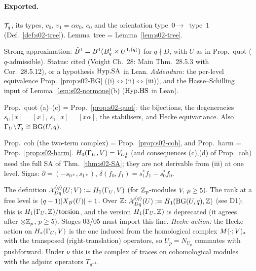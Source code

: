 \paragraph{Exported.}
\begin{interface}\label{if:s02-tree}
$\mathcal{T}_q$, its types, $v_0$, $v_1=\alpha v_0$, $e_0$ and the orientation type~$0\to$~type~$1$
(Def.~\ref{def:s02-tree}). Lemma~tree = Lemma~\ref{lem:s02-tree}.
\end{interface}
\begin{interface}[\texttt{if:s02-SA}]\label{if:s02-SA}
Strong approximation: $\hat{B}^1=B^1(B^1_q\times U^{1,(q)})$ for $q\nmid D$, with $U$ as in Prop.~quot
($q$-admissible). Status: cited (Voight Ch.~28: Main Thm.~28.5.3 with Cor.~28.5.12), or a hypothesis $\mathrm{Hyp.SA}$
in Lean. \emph{Addendum:} the per-level equivalence Prop.~\ref{prop:s02-BG} ((i)$\Leftrightarrow$(ii)$\Leftrightarrow$(iii)),
and the Hasse--Schilling input of Lemma~\ref{lem:s02-normone}(b) ($\mathrm{Hyp.HS}$ in Lean).
\end{interface}
\begin{interface}\label{if:s02-quot}
Prop.~quot (a)--(c) = Prop.~\ref{prop:s02-quot}: the bijections, the degeneracies $s_0[x]=[x]$, $s_1[x]=[x\alpha]$,
the stabilisers, and Hecke equivariance. Also $\Gamma_U\backslash\mathcal{T}_q\cong\mathrm{BG}(U,q)$.
\end{interface}
\begin{interface}\label{if:s02-coh}
Prop.~coh (the two-term complex) = Prop.~\ref{prop:s02-coh}, and Prop.~harm = Prop.~\ref{prop:s02-harm}.
$H_0(\Gamma_U,V)=V_{U_p^1}$ (and consequences (c),(d) of Prop.~coh) need the full SA of Thm.~\ref{thm:s02-SA}; they are not derivable from (iii) at one level. Signs: $\partial=(-s_{0*},s_{1*})$, $\delta(f_0,f_1)=s_1^*f_1-s_0^*f_0$.
\end{interface}
\begin{interface}\label{if:s02-indef}
The definition $\mathcal{X}^{(q)}_{Dq}(U;V):=H_1(\Gamma_U,V)$ (for $\mathbb{Z}_p$-modules $V$, $p\ge5$). The rank at a free level
is $(q-1)|X_B(U)|+1$. Over $\mathbb{Z}$: $\mathcal{X}^{(q)}_{Dq}(U):=H_1(\mathrm{BG}(U,q),\mathbb{Z})$ (see D1); this is $H_1(\Gamma_U,\mathbb{Z})/\mathrm{torsion}$, and the version $H_1(\Gamma_U,\mathbb{Z})$ is deprecated (it agrees after $\otimes\mathbb{Z}_p$, $p\ge5$). Stages 03/05 must import this line.
\emph{Hecke action:} the Hecke action on $H_*(\Gamma_U,V)$ is the one induced from the homological complex $M(\cdot;V)_*$ with the transposed (right-translation) operators, so $U_p=N_{U_p}$ commutes with pushforward. Under $\nu$ this is the complex of traces on cohomological modules with the adjoint operators $T_{g^{-1}}$.
\end{interface}

